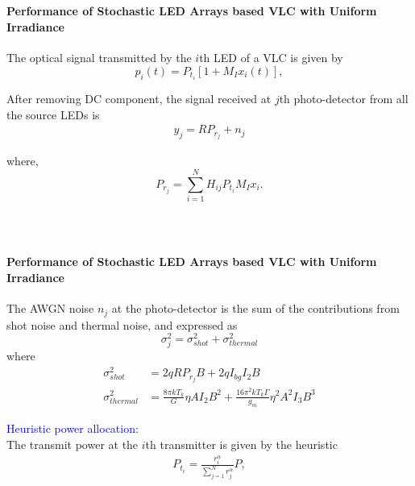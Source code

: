 \documentclass[slidestop,usepdftitle=false]{gvvslides}
\providecommand{\sbrak}[1]{\ensuremath{{}\left[#1\right]}}
\begin{document}
\begin{frame}
\frametitle{\,}
\framesubtitle{Performance of Stochastic LED Arrays based VLC with Uniform Irradiance}
\begin{list}{}{}
\vfill
\item<1->The optical signal transmitted by the $i$th LED of a VLC is given by %
%
\begin{equation}
p_i(t) = P_{t_i} \sbrak{1 + M_I x_i(t)},\nonumber
\end{equation}
\vfill
\item<2>After removing DC component, the signal received at $j$th photo-detector from all the source LEDs is 
\begin{align}
\label{rx_j}
y_j=RP_{r_j}+n_j\nonumber
\end{align}

\vfill
where,
\begin{equation}
\label{rx_pow}
P_{r_j}=\sum_{i=1}^NH_{ij}P_{t_i}M_Ix_i.\nonumber
\end{equation}
\vfill
\end{list}
\end{frame}
%
\begin{frame}
\frametitle{\,}
\framesubtitle{Performance of Stochastic LED Arrays based VLC with Uniform Irradiance}
\begin{list}{}{}
\vfill
\item<1->The AWGN noise $n_j$ at the photo-detector is 
the sum of the contributions from shot noise and thermal noise, and expressed as %
%
\begin{equation}
\label{variance}
\sigma_j^2 = \sigma_{shot}^2+\sigma_{thermal}^2 \nonumber
\end{equation}
\vfill
where
\begin{equation}
\begin{split}
\sigma_{shot}^2 &= 2qRP_{r_j}B + 2q I_{bg} I_2 B \\
\sigma_{thermal}^2 &=\frac{8\pi kT_k}{G}\eta AI_2B^2 + \frac{16\pi^2kT_k\Gamma}{g_m}\eta^2 A^2I_3B^3
\end{split}\nonumber
\end{equation}
\vfill
\item<2> \textcolor{blue}{Heuristic power allocation:}\\
The transmit power at the $i$th transmitter is 
given by the heuristic
\begin{align}
\label{power_alloc}
P_{t_i}=\frac{r_i^{\alpha}}{\sum_{j=1}^Nr_j^{\alpha}}P,\nonumber
\end{align}
\vfill
\end{list}
\end{frame}
\end{document}
